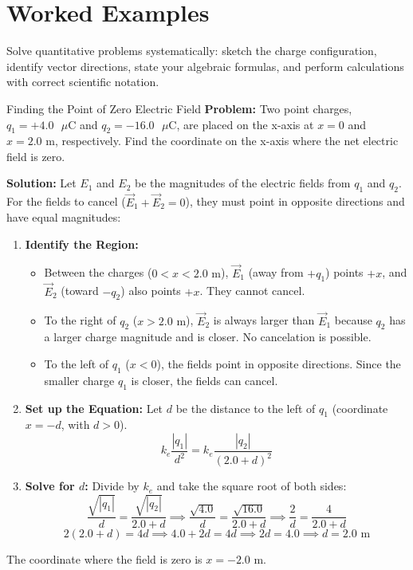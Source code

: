 \section*{Worked Examples}

Solve quantitative problems systematically: sketch the charge configuration, identify vector directions, state your algebraic formulas, and perform calculations with correct scientific notation.

\vspace{10pt}

\begin{examplebox}{Finding the Point of Zero Electric Field}
\textbf{Problem:} Two point charges, $q_1 = +4.0\text{ }\mu\text{C}$ and $q_2 = -16.0\text{ }\mu\text{C}$, are placed on the x-axis at $x = 0$ and $x = 2.0\text{ m}$, respectively. Find the coordinate on the x-axis where the net electric field is zero.

\vspace{0.8em}
\textbf{Solution:}
Let $E_1$ and $E_2$ be the magnitudes of the electric fields from $q_1$ and $q_2$. For the fields to cancel ($\vec{E}_1 + \vec{E}_2 = 0$), they must point in opposite directions and have equal magnitudes:
\begin{enumerate}
    \item \textbf{Identify the Region:}
    \begin{itemize}
        \item Between the charges ($0 < x < 2.0\text{ m}$), $\vec{E}_1$ (away from $+q_1$) points $+x$, and $\vec{E}_2$ (toward $-q_2$) also points $+x$. They cannot cancel.
        \item To the right of $q_2$ ($x > 2.0\text{ m}$), $\vec{E}_2$ is always larger than $\vec{E}_1$ because $q_2$ has a larger charge magnitude and is closer. No cancelation is possible.
        \item To the left of $q_1$ ($x < 0$), the fields point in opposite directions. Since the smaller charge $q_1$ is closer, the fields can cancel.
    \end{itemize}
    
    \item \textbf{Set up the Equation:}
    Let $d$ be the distance to the left of $q_1$ (coordinate $x = -d$, with $d > 0$).
    \[ k_e \frac{|q_1|}{d^2} = k_e \frac{|q_2|}{(2.0 + d)^2} \]
    
    \item \textbf{Solve for $d$:}
    Divide by $k_e$ and take the square root of both sides:
    \[ \frac{\sqrt{|q_1|}}{d} = \frac{\sqrt{|q_2|}}{2.0 + d} \implies \frac{\sqrt{4.0}}{d} = \frac{\sqrt{16.0}}{2.0 + d} \implies \frac{2}{d} = \frac{4}{2.0 + d} \]
    \[ 2(2.0 + d) = 4d \implies 4.0 + 2d = 4d \implies 2d = 4.0 \implies d = 2.0\text{ m} \]
\end{enumerate}
The coordinate where the field is zero is $x = -2.0\text{ m}$.
\end{examplebox}

